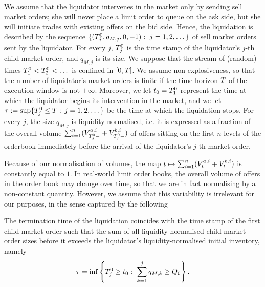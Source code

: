 \documentclass[10pt]{article}
\begin{document}
We assume that the liquidator intervenes in the market only by sending sell market orders; she will never place a limit order to queue on the ask side, but she will initiate trades with existing offers on the bid side. 
Hence, the liquidation is described by the sequence $\lbrace (\arrivalTimes[0]_j, q_{M,j},0,-1): \, \, j=1,2,\dots \rbrace$ of sell market orders sent by the liquidator. For every $j$, $\arrivalTimes[0]_j$ is the time stamp of the liquidator's $j$-th child market order, and $q_{M,j}$ is its size. 
We suppose that the stream of (random) times $\arrivalTimes[0]_1 < \arrivalTimes[0]_2 < \dots$ is confined in $\timeWindow$. We assume non-explosiveness, so that the number of liquidator's market orders is finite if the time horizon $\timeHorizon$ of the execution window is not $+\infty$. Moreover, we let $\initialTime = \arrivalTimes[0]_1$ represent the time at which the liquidator begins its intervention in the market, and we let $\terminationTime:=\sup\lbrace\arrivalTimes[0]_j\leq\timeHorizon: \, j=1,2,\dots\rbrace$ be the time at which the liquidation stops. 
For every $j$, the size $q_{M,j}$ is liquidity-normalised, i.e. it is expressed as a fraction of the overall volume $\sum_{i=1}^{n}(\nthBestAskVolume[i]_{\arrivalTimes[0]_j-} + \nthBestBidVolume[i]_{\arrivalTimes[0]_j-})$ of offers sitting on the first $n$ levels of the orderbook immediately before the arrival of the liquidator's $j$-th market order.

Because of our normalisation of volumes, the map  $t\mapsto \sum_{i=1}^{n}(\nthBestAskVolume[i]_t +\nthBestBidVolume[i]_t)$ is constantly equal to $1$. In real-world limit order books, the overall volume of offers in the order book may change over time, so that we are in fact normalising by a non-constant quantity. However, we assume that this variability is irrelevant for our purposes, in the sense captured by the following 
\begin{assumption}\label{assumption.termination-time_of_liquidation}
 The termination time of the liquidation coincides with the time stamp of the first child market order such that the sum of all liquidity-normalised child market order sizes before it  exceeds the liquidator's liquidity-normalised initial inventory, namely
 \begin{equation*}
\terminationTime = \inf\left\lbrace \arrivalTimes[0]_j \geq \initialTime : \, \, 
 \sum_{k=1}^{j} q_{M,k} \geq \metaorderSize \right\rbrace.
 \end{equation*}
\end{assumption}
\end{document}

